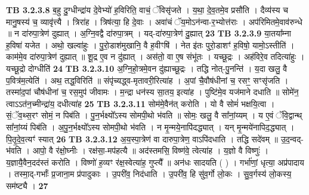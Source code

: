 \documentclass[17pt]{extarticle}
\begin{document}
{{{{{{{{{{{{{{{{{{{                  \newline
                                \textbf{ TB 3.2.3.8} \newline
                  ब॒हु दु॒ग्धीन्द्रा॑य दे॒वेभ्यो॑ ह॒विरिति॒ वाचं॒ ॅविसृ॑जते । य॒था॒ दे॒व॒तमे॒व प्रसौ॑ति । दैव्य॑स्य च मानु॒षस्य॑ च॒ व्यावृ॑त्त्यै । त्रिरा॑ह । त्रिष॑त्या॒ हि दे॒वाः । अवा॑चं ॅय॒मोऽन॑न्वा-र॒भ्योत्त॑राः । अप॑रिमितमे॒वाव॑रुन्धे ॥ न दा॑रुपा॒त्रेण॑ दुह्यात् । अ॒ग्नि॒वद्वै दा॑रुपा॒त्रम् । यद्-दा॑रुपा॒त्रेण॑ दु॒ह्यात् \textbf{ 23} \newline
                  \newline
                                \textbf{ TB 3.2.3.9} \newline
                  या॒तया᳚म्ना ह॒विषा॑ यजेत । अथो॒ खल्वा॑हुः । पु॒रो॒डाश॑मुखानि॒ वै ह॒वीꣳषि॑ । नेत इ॑तः पुरो॒डाशꣳ॑ ह॒विषो॒ यामो॒ऽस्तीति॑ । काम॑मे॒व दा॑रुपा॒त्रेण॑ दुह्यात् ॥ शू॒द्र ए॒व न दु॑ह्यात् । अस॑तो॒ वा ए॒ष संभू॑तः । यच्छू॒द्रः । अह॑विरे॒व तदित्या॑हुः । यच्छू॒द्रो दोग्धीति॑ \textbf{ 24} \newline
                  \newline
                                \textbf{ TB 3.2.3.10} \newline
                  अ॒ग्नि॒हो॒त्रमे॒वन दु॑ह्याच्छू॒द्रः । तद्धि नोत्-पु॒नन्ति॑ । य॒दा खलु॒ वै प॒वित्र॑म॒त्येति॑ । अथ॒ तद्ध॒विरिति॑ ॥ संपृ॑च्यद्ध्व-मृतावरी॒रित्या॑ह । अ॒पां चै॒वौष॑धीनां च॒ रसꣳ॒॒ सꣳसृ॑जति । तस्मा॑द॒पां चौष॑धीनां च॒ रस॒मुप॑ जीवामः । म॒न्द्रा धन॑स्य सा॒तय॒ इत्या॑ह । पुष्टि॑मे॒व यज॑माने दधाति ॥ सोमे॑न॒ त्वाऽऽत॑न॒च्मीन्द्रा॑य॒ दधीत्या॑ह \textbf{ 25} \newline
                  \newline
                                \textbf{ TB 3.2.3.11} \newline
                  सोम॑मे॒वैन॑त् करोति । यो वै सोमं॑ भक्षयि॒त्वा । सं॒ॅव॒थ्स॒रꣳ सोमं॒ न पिब॑ति । पु॒न॒र्भक्ष्यो᳚ऽस्य सोमपी॒थो भ॑वति ॥ सोमः॒ खलु॒ वै सा᳚नां॒य्यम् । य ए॒वं ॅवि॒द्वान्थ् सा᳚नां॒य्यं पिब॑ति । अ॒पु॒न॒र्भक्ष्यो᳚ऽस्य सोमपी॒थो भ॑वति । न मृ॒न्मये॒नापि॑दद्ध्यात् । यन् मृ॒न्मये॑नापिद॒द्ध्यात् । पि॒तृ॒दे॒व॒त्यꣳ॑ स्यात् \textbf{ 26} \newline
                  \newline
                                \textbf{ TB 3.2.3.12} \newline
                  अ॒य॒स्पा॒त्रेण॑ वा दारुपा॒त्रेण॒ वाऽपि॑दधाति । तद्धि सदे॑वम् ॥ उ॒द॒न्वद्- भ॑वति । आपो॒ वै र॑क्षो॒घ्नीः । रक्ष॑सा॒-मप॑हत्यै ॥ अद॑स्तमसि॒ विष्ण॑वे॒ त्वेत्या॑ह । य॒ज्ञो वै विष्णुः॑ । य॒ज्ञायै॒वैन॒दद॑स्तं करोति । विष्णो॑ ह॒व्यꣳ र॑क्ष॒स्वेत्या॑ह॒ गुप्त्यै᳚ ॥ अन॑धः सादयति ( ) । गर्भा॑णां॒ धृत्या॒ अप्र॑पादाय । तस्मा॒द्-गर्भाः᳚ प्र॒जाना॒म प्र॑पादुकाः । उ॒परी॑व॒ निद॑धाति । उ॒परी॑व॒ हि सु॑व॒र्गो लो॒कः । सु॒व॒र्गस्य॑ लो॒कस्य॒ सम॑ष्ट्यै । \textbf{ 27} \newline
}}}}}}}}}}}}}}}}}}}
\end{document}
